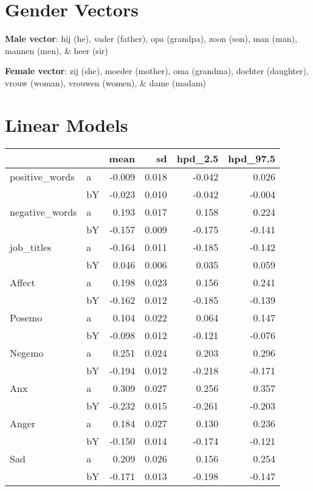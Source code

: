 \documentclass[11pt,a4paper]{article}
\begin{document}
\appendix
\section{Gender Vectors}
\textbf{Male vector}: hij (he), vader (father), opa (grandpa), zoon (son), man (man), mannen (men), \& heer (sir)

\textbf{Female vector}: zij (she), moeder (mother), oma (grandma), dochter (daughter), vrouw (woman), vrouwen (women), \& dame (madam)


\section{Linear Models}
\tiny
\begin{longtable}{llrrrr}
\toprule
      &    &   mean &     sd &  hpd\_2.5 &  hpd\_97.5 \\
\midrule
positive\_words & a & -0.009 &  0.018 &   -0.042 &     0.026 \\
      & bY & -0.023 &  0.010 &   -0.042 &    -0.004 \\
negative\_words & a &  0.193 &  0.017 &    0.158 &     0.224 \\
      & bY & -0.157 &  0.009 &   -0.175 &    -0.141 \\
job\_titles & a & -0.164 &  0.011 &   -0.185 &    -0.142 \\
      & bY &  0.046 &  0.006 &    0.035 &     0.059 \\
Affect & a &  0.198 &  0.023 &    0.156 &     0.241 \\
      & bY & -0.162 &  0.012 &   -0.185 &    -0.139 \\
Posemo & a &  0.104 &  0.022 &    0.064 &     0.147 \\
      & bY & -0.098 &  0.012 &   -0.121 &    -0.076 \\
Negemo & a &  0.251 &  0.024 &    0.203 &     0.296 \\
      & bY & -0.194 &  0.012 &   -0.218 &    -0.171 \\
Anx & a &  0.309 &  0.027 &    0.256 &     0.357 \\
      & bY & -0.232 &  0.015 &   -0.261 &    -0.203 \\
Anger & a &  0.184 &  0.027 &    0.130 &     0.236 \\
      & bY & -0.150 &  0.014 &   -0.174 &    -0.121 \\
Sad & a &  0.209 &  0.026 &    0.156 &     0.254 \\
      & bY & -0.171 &  0.013 &   -0.198 &    -0.147 \\

\end{longtable}
\end{document}
